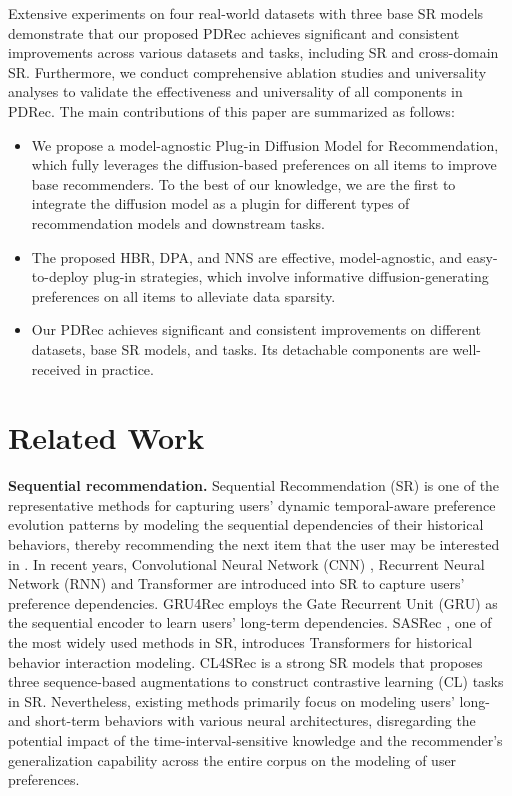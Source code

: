 \documentclass[letterpaper]{article} %
\begin{document}
Extensive experiments on four real-world datasets with three base SR models demonstrate that our proposed PDRec achieves significant and consistent improvements across various datasets and tasks, including SR and cross-domain SR. Furthermore, we conduct comprehensive ablation studies and universality analyses to validate the effectiveness and universality of all components in PDRec.
The main contributions of this paper are summarized as follows:
\begin{itemize}[leftmargin=*, topsep=0.2pt,parsep=0pt]
  \item We propose a model-agnostic Plug-in Diffusion Model for Recommendation, which fully leverages the diffusion-based preferences on all items to improve base recommenders. To the best of our knowledge, we are the first to integrate the diffusion model as a plugin for different types of recommendation models and downstream tasks.
  \item The proposed HBR, DPA, and NNS are effective, model-agnostic, and easy-to-deploy plug-in strategies, which involve informative diffusion-generating preferences on all items to alleviate data sparsity.
  \item Our PDRec achieves significant and consistent improvements on different datasets, base SR models, and tasks. Its detachable components are well-received in practice.
\end{itemize}

\section{Related Work}
\textbf{Sequential recommendation.}
Sequential Recommendation (SR) is one of the representative methods for capturing users' dynamic temporal-aware preference evolution patterns by modeling the sequential dependencies of their historical behaviors, thereby recommending the next item that the user may be interested in \cite{MLP4Rec}.
In recent years, Convolutional Neural Network (CNN) \cite{RCNN, Caser}, Recurrent Neural Network (RNN) \cite{NARM, GRU4Rec} and Transformer \cite{BERT4Rec, SASRec} are introduced into SR to capture users' preference dependencies. GRU4Rec \cite{GRU4Rec} employs the Gate Recurrent Unit (GRU) as the sequential encoder to learn users' long-term dependencies. SASRec \cite{SASRec}, one of the most widely used methods in SR, introduces Transformers for historical behavior interaction modeling.
CL4SRec \cite{CL4SRec} is a strong SR models that proposes three sequence-based augmentations to construct contrastive learning (CL) tasks in SR. Nevertheless, existing methods primarily focus on modeling users' long- and short-term behaviors with various neural architectures, disregarding the potential impact of the time-interval-sensitive knowledge and the recommender's generalization capability across the entire corpus on the modeling of user preferences.
\end{document}
